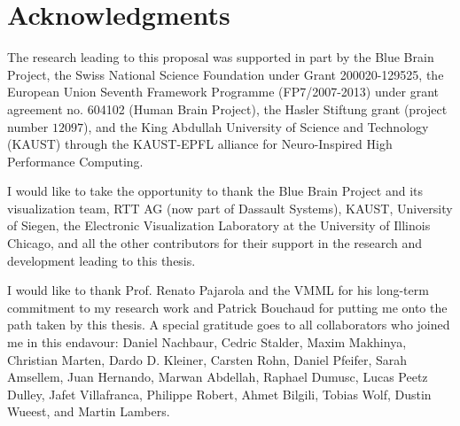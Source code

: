 

\chapter*{Acknowledgments}
The research leading to this proposal was supported in part by the Blue Brain
Project, the Swiss National Science Foundation under Grant 200020-129525, the
European Union Seventh Framework Programme (FP7/2007-2013) under grant agreement
no. 604102 (Human Brain Project), the Hasler Stiftung grant (project number
$12097$), and the King Abdullah University of Science and Technology (KAUST)
through the KAUST-EPFL alliance for Neuro-Inspired High Performance Computing.

I would like to take the opportunity to thank the Blue Brain Project and its
visualization team, RTT AG (now part of Dassault Systems), KAUST, University of
Siegen, the Electronic Visualization Laboratory at the University of Illinois
Chicago, and all the other contributors for their support in the research and
development leading to this thesis.

I would like to thank Prof. Renato Pajarola and the VMML for his long-term
commitment to my research work and Patrick Bouchaud for putting me onto the
path taken by this thesis. A special gratitude goes to all collaborators who
joined me in this endavour: Daniel Nachbaur, Cedric Stalder, Maxim Makhinya,
Christian Marten, Dardo D. Kleiner, Carsten Rohn, Daniel Pfeifer, Sarah
Amsellem, Juan Hernando, Marwan Abdellah, Raphael Dumusc, Lucas Peetz Dulley,
Jafet Villafranca, Philippe Robert, Ahmet Bilgili, Tobias Wolf, Dustin Wueest,
and Martin Lambers.
